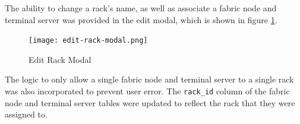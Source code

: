 The ability to change a rack's name, as well as associate a fabric node and terminal server was provided in the edit modal, which is shown in figure \ref{fig:edit-rack-modal}.

\begin{figure}[H]
    \centering
    \texttt{[image: edit-rack-modal.png]}
    \caption{Edit Rack Modal}
    \label{fig:edit-rack-modal}
\end{figure}

The logic to only allow a single fabric node and terminal server to a single rack was also incorporated to prevent user error. The \verb|rack_id| column of the fabric node and terminal server tables were updated to reflect the rack that they were assigned to.


